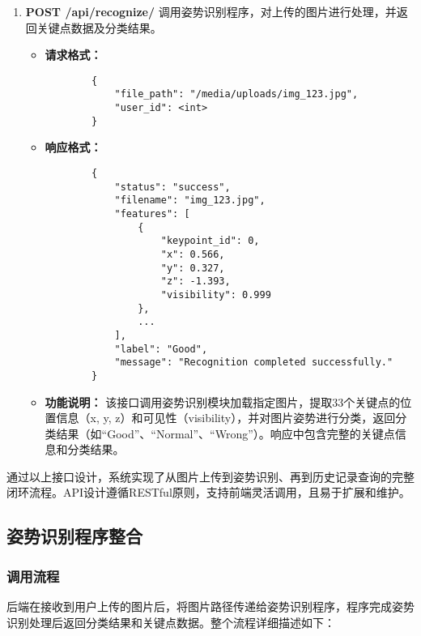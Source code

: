 \begin{enumerate}
\begin{itemize}
    \end{itemize}

    \item \textbf{POST /api/recognize/}
    调用姿势识别程序，对上传的图片进行处理，并返回关键点数据及分类结果。
    \begin{itemize}
        \item \textbf{请求格式：}
        \begin{lstlisting}
        {
            "file_path": "/media/uploads/img_123.jpg",
            "user_id": <int>
        }
        \end{lstlisting}
        \item \textbf{响应格式：}
        \begin{lstlisting}
        {
            "status": "success",
            "filename": "img_123.jpg",
            "features": [
                {
                    "keypoint_id": 0,
                    "x": 0.566,
                    "y": 0.327,
                    "z": -1.393,
                    "visibility": 0.999
                },
                ...
            ],
            "label": "Good",
            "message": "Recognition completed successfully."
        }
        \end{lstlisting}
        \item \textbf{功能说明：}
        该接口调用姿势识别模块加载指定图片，提取33个关键点的位置信息（x, y, z）和可见性（visibility），并对图片姿势进行分类，返回分类结果（如“Good”、“Normal”、“Wrong”）。响应中包含完整的关键点信息和分类结果。

    \end{itemize}

\end{enumerate}

通过以上接口设计，系统实现了从图片上传到姿势识别、再到历史记录查询的完整闭环流程。API设计遵循RESTful原则，支持前端灵活调用，且易于扩展和维护。


\subsection{姿势识别程序整合}

\subsubsection{调用流程}

后端在接收到用户上传的图片后，将图片路径传递给姿势识别程序，程序完成姿势识别处理后返回分类结果和关键点数据。整个流程详细描述如下：

